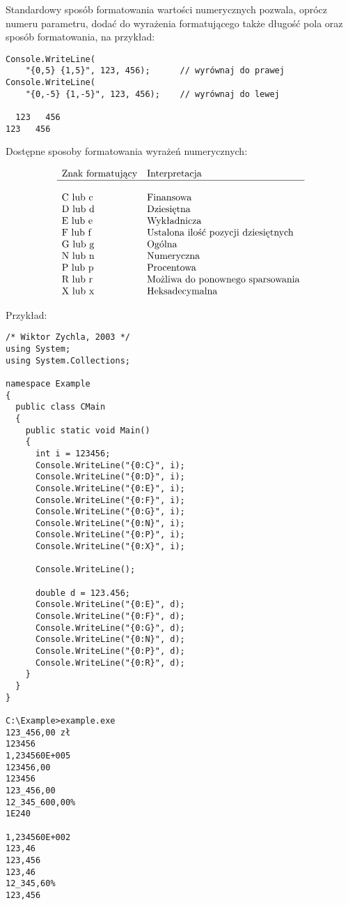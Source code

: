 Standardowy sposób formatowania wartości numerycznych pozwala, oprócz numeru parametru, dodać do
wyrażenia formatującego także długość pola oraz sposób formatowania, na przykład:

\begin{scriptsize}
\begin{verbatim}
Console.WriteLine(
    "{0,5} {1,5}", 123, 456);      // wyrównaj do prawej
Console.WriteLine(
    "{0,-5} {1,-5}", 123, 456);    // wyrównaj do lewej

  123   456
123   456
\end{verbatim}
\end{scriptsize}

Dostępne sposoby formatowania wyrażeń numerycznych:

\begin{center}
$$\begin{array}{ll}
\mbox{Znak formatujący} & \mbox{Interpretacja}  \\
\hline \\
\mbox{C lub c} & \mbox{Finansowa}   \\
\mbox{D lub d} & \mbox{Dziesiętna}  \\
\mbox{E lub e} & \mbox{Wykładnicza} \\
\mbox{F lub f} & \mbox{Ustalona ilość pozycji dziesiętnych} \\
\mbox{G lub g} & \mbox{Ogólna}      \\
\mbox{N lub n} & \mbox{Numeryczna}  \\ 
\mbox{P lub p} & \mbox{Procentowa}  \\
\mbox{R lub r} & \mbox{Możliwa do ponownego sparsowania} \\
\mbox{X lub x} & \mbox{Heksadecymalna}
\end{array}$$
\end{center}

Przykład:

\begin{scriptsize}
\begin{verbatim}
/* Wiktor Zychla, 2003 */
using System;
using System.Collections;

namespace Example
{ 
  public class CMain
  {    
    public static void Main()
    {
      int i = 123456;
      Console.WriteLine("{0:C}", i); 
      Console.WriteLine("{0:D}", i); 
      Console.WriteLine("{0:E}", i); 
      Console.WriteLine("{0:F}", i); 
      Console.WriteLine("{0:G}", i); 
      Console.WriteLine("{0:N}", i); 
      Console.WriteLine("{0:P}", i); 
      Console.WriteLine("{0:X}", i); 
      
      Console.WriteLine();
      
      double d = 123.456;
      Console.WriteLine("{0:E}", d); 
      Console.WriteLine("{0:F}", d); 
      Console.WriteLine("{0:G}", d); 
      Console.WriteLine("{0:N}", d); 
      Console.WriteLine("{0:P}", d); 
      Console.WriteLine("{0:R}", d);     	
    }
  }
}

C:\Example>example.exe
123_456,00 zł
123456
1,234560E+005
123456,00
123456
123_456,00
12_345_600,00%
1E240

1,234560E+002
123,46
123,456
123,46
12_345,60%
123,456
\end{verbatim}
\end{scriptsize}

